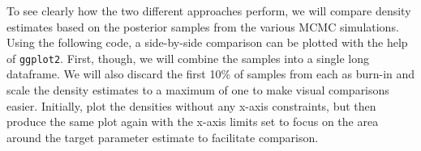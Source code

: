 \documentclass[]{article}
\newenvironment{Shaded}{\begin{snugshade}}{\end{snugshade}}
\newcommand{\KeywordTok}[1]{\textcolor[rgb]{0.13,0.29,0.53}{\textbf{#1}}}
\newcommand{\DataTypeTok}[1]{\textcolor[rgb]{0.13,0.29,0.53}{#1}}
\newcommand{\DecValTok}[1]{\textcolor[rgb]{0.00,0.00,0.81}{#1}}
\newcommand{\FloatTok}[1]{\textcolor[rgb]{0.00,0.00,0.81}{#1}}
\newcommand{\StringTok}[1]{\textcolor[rgb]{0.31,0.60,0.02}{#1}}
\newcommand{\OperatorTok}[1]{\textcolor[rgb]{0.81,0.36,0.00}{\textbf{#1}}}
\newcommand{\NormalTok}[1]{#1}
\begin{document}
To see clearly how the two different approaches perform, we will compare
density estimates based on the posterior samples from the various MCMC
simulations. Using the following code, a side-by-side comparison can be
plotted with the help of \texttt{ggplot2}. First, though, we will
combine the samples into a single long dataframe. We will also discard
the first 10\% of samples from each as burn-in and scale the density
estimates to a maximum of one to make visual comparisons easier.
Initially, plot the densities without any x-axis constraints, but then
produce the same plot again with the x-axis limits set to focus on the
area around the target parameter estimate to facilitate comparison.

\begin{Shaded}
\end{Shaded}
\end{document}
